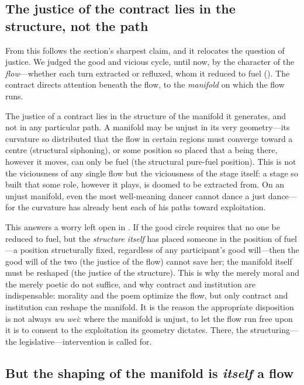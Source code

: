 \subsection{The justice of the contract lies in the structure, not the path}
\label{p09:sec:contract-justice}

From this follows the section's sharpest claim, and it relocates the question of justice. We judged the good and vicious cycle, until now, by the character of the \emph{flow}---whether each turn extracted or refluxed, whom it reduced to fuel (). The contract directs attention beneath the flow, to the \emph{manifold} on which the flow runs.

\begin{claim}
The justice of a contract lies in the structure of the manifold it generates, and not in any particular path. A manifold may be unjust in its very geometry---its curvature so distributed that the flow in certain regions must converge toward a centre (structural siphoning), or some position so placed that a being there, however it moves, can only be fuel (the structural pure-fuel position). This is not the viciousness of any single flow but the viciousness of the stage itself: a stage so built that some role, however it plays, is doomed to be extracted from. On an unjust manifold, even the most well-meaning dancer cannot dance a just dance---for the curvature has already bent each of his paths toward exploitation.
\end{claim}

This answers a worry left open in . If the good circle requires that no one be reduced to fuel, but the \emph{structure itself} has placed someone in the position of fuel---a position structurally fixed, regardless of any participant's good will---then the good will of the two (the justice of the flow) cannot save her; the manifold itself must be reshaped (the justice of the structure). This is why the merely moral and the merely poetic do not suffice, and why contract and institution are indispensable: morality and the poem optimize the flow, but only contract and institution can reshape the manifold. It is the reason the appropriate disposition is not always \emph{wu wei}: where the manifold is unjust, to let the flow run free upon it is to consent to the exploitation its geometry dictates. There, the structuring---the legislative---intervention is called for.

\subsection{But the shaping of the manifold is \emph{itself} a flow}
\label{p09:sec:legislation-is-flow}

